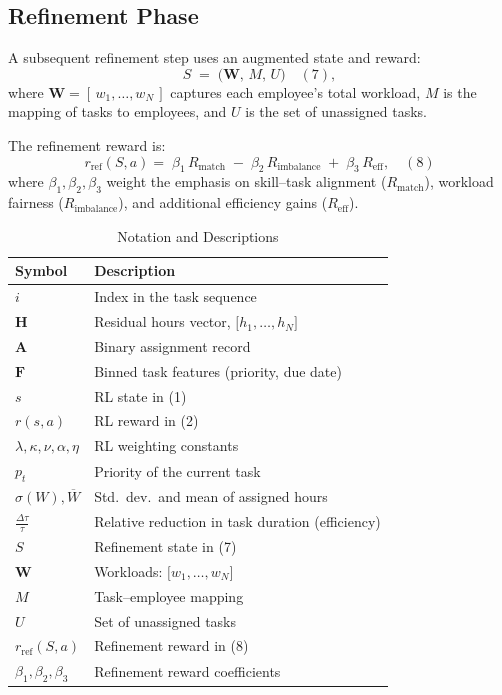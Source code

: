 \documentclass[conference]{IEEEtran}
\begin{document}
	\subsection{Refinement Phase}
	
	A subsequent refinement step uses an augmented state and reward:
	\[
	S \;=\; \bigl(\mathbf{W},\, M,\, U\bigr)\quad (7),
	\]
	where $\mathbf{W}=[\,w_{1},\dots,w_{N}\,]$ captures each employee’s total workload, $M$ is the mapping of tasks to employees, and $U$ is the set of unassigned tasks.
	
	The refinement reward is:
	\[
	r_{\text{ref}}(S,a)
	=\; \beta_{1}\,R_{\text{match}}\;-\;\beta_{2}\,R_{\text{imbalance}}\;+\;\beta_{3}\,R_{\text{eff}},
	\quad(8)
	\]
	where $\beta_{1},\beta_{2},\beta_{3}$ weight the emphasis on skill--task alignment ($R_{\text{match}}$), workload fairness ($R_{\text{imbalance}}$), and additional efficiency gains ($R_{\text{eff}}$).
	
	\begin{table}[H]
		\centering
		\footnotesize
		\caption{Notation and Descriptions}
		\label{tab:notation}
		\renewcommand{\arraystretch}{1.15}
		\begin{tabularx}{\linewidth}{lX}
			\toprule
			\textbf{Symbol} & \textbf{Description} \\
			\midrule
			$i$ & Index in the task sequence\\
			$\mathbf{H}$ & Residual hours vector, $\bigl[h_{1},\dots,h_{N}\bigr]$\\
			$\mathbf{A}$ & Binary assignment record \\
			$\mathbf{F}$ & Binned task features (priority, due date)\\
			$s$ & RL state in (1)\\
			$r(s,a)$ & RL reward in (2)\\
			$\lambda,\kappa,\nu,\alpha,\eta$ & RL weighting constants\\
			$p_{t}$ & Priority of the current task\\
			$\sigma(W), \overline{W}$ & Std.\ dev.\ and mean of assigned hours\\
			$\tfrac{\Delta\tau}{\tau}$ & Relative reduction in task duration (efficiency)\\
			$S$ & Refinement state in (7)\\
			$\mathbf{W}$ & Workloads: $\bigl[w_{1},\dots,w_{N}\bigr]$\\
			$M$ & Task--employee mapping \\
			$U$ & Set of unassigned tasks\\
			$r_{\text{ref}}(S,a)$ & Refinement reward in (8)\\
			$\beta_{1},\beta_{2},\beta_{3}$ & Refinement reward coefficients\\
			\bottomrule
		\end{tabularx}
	\end{table}
	
\end{document}

